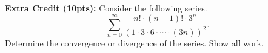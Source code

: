 \documentclass[addpoints]{exam}
\begin{document}
\newpage

\noindent\textbf{Extra Credit (10pts):} Consider the following series. \[\sum_{n=0}^\infty\frac{n!\cdot(n+1)!\cdot3^n}{\left(1\cdot3\cdot6\cdot\cdots\cdot(3n)\right)^2}.\] Determine the convergence or divergence of the series. Show all work.
\end{document}
